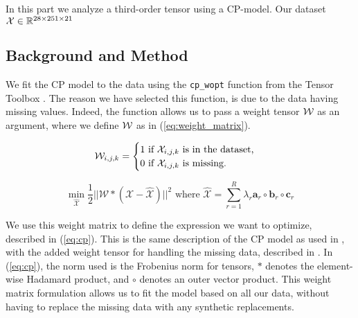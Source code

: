 In this part we analyze a third-order tensor using a CP-model.
Our dataset $\mathcal{X}\in \mathbb{R}^{28 \times 251 \times 21}$


\subsection*{Background and Method}

We fit the CP model to the data using the \texttt{cp\_wopt} function from the Tensor Toolbox \cite{tentool}.
The reason we have selected this function, is due to the data having missing values.
Indeed, the function allows us to pass a weight tensor $\mathcal{W}$ as an argument, where we define $\mathcal{W}$ as in (\ref{eq:weight_matrix}).


\begin{equation}
\mathcal{W}_{i,j,k} = \begin{cases}
    1 \ \text{if} \ \mathcal{X}_{i,j,k} \ \text{is in the dataset,} \\
    0 \ \text{if} \ \mathcal{X}_{i,j,k} \ \text{is missing.}
\end{cases}
\label{eq:weight_matrix}
\end{equation}

\begin{equation}
    \min_{ \mathcal{\hat{X}}} \frac{1}{2} ||\mathcal{W} * (\mathcal{X} - \mathcal{\hat{X}})||^2 \text{  where } \mathcal{\hat{X}} = \sum_{r = 1}^{R} \lambda_r \mathbf{a}_r \circ \mathbf{b}_r \circ \mathbf{c}_r
    \label{eq:cp}
\end{equation}

We use this weight matrix to define the expression we want to optimize, described in (\ref{eq:cp}).
This is the same description of the CP model as used in \textcite{tensor-review}, with the added weight tensor for handling the missing data, described in \textcite{cp-wopt}.
In (\ref{eq:cp}), the norm used is the Frobenius norm for tensors, $*$ denotes the element-wise Hadamard product, and $\circ$ denotes an outer vector product.
This weight matrix formulation allows us to fit the model based on all our data, without having to replace the missing data with any synthetic replacements.


